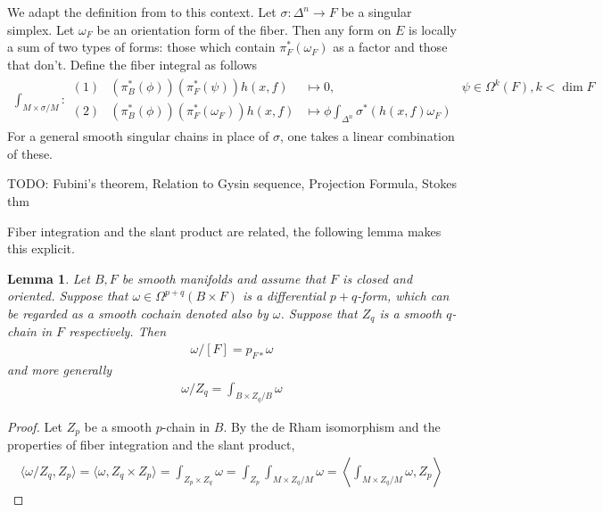 \documentclass{scrartcl}
\theoremstyle{plain}
\newtheorem{lemma}[theorem]{Lemma}
\theoremstyle{definition}
\begin{document}
    We adapt the definition from \cite{bott1982differential} to this context. Let $\sigma\colon \Delta^n\to F$ be a singular simplex. Let $\omega_F$ be an orientation form of the fiber. Then any form on $E$ is locally a sum of two types of forms: those which contain $\pi_F^*(\omega_F)$ as a factor and those that don't. Define the fiber integral as follows
    \begin{align*}
        \int_{M\times\sigma / M} \colon \begin{array}{llll}
             (1) & (\pi_B^*(\phi)) (\pi_F^*(\psi)) h(x, f)  &\mapsto 0, & \psi\in \Omega^k(F), k<\dim F \\
             (2) & (\pi_B^*(\phi)) (\pi_F^*(\omega_F)) h(x, f)  &\mapsto \phi \int_{\Delta^n} \sigma^*(h(x, f) \omega_F) &
        \end{array}
    \end{align*}
    For a general smooth singular chains in place of $\sigma$, one takes a linear combination of these. 

    TODO: Fubini's theorem, Relation to Gysin sequence, Projection Formula, Stokes thm

    Fiber integration and the slant product are related, the following lemma makes this explicit.
    \begin{lemma}
        Let $B, F$ be smooth manifolds and assume that $F$ is closed and oriented. Suppose that $\omega\in \Omega^{p+q}(B\times F)$ is a differential $p+q$-form, which can be regarded as a smooth cochain denoted also by $\omega$. Suppose that $Z_q$ is a smooth $q$-chain in $F$ respectively. Then 
        \begin{align*}
            \omega/[F] = p_{F*}\omega
        \end{align*}
        and more generally
        \begin{align*}
            \omega/Z_q = \int_{B\times Z_q / B} \omega
        \end{align*}
    \end{lemma}
    \begin{proof}
        Let $Z_p$ be a smooth $p$-chain in $B$. By the de Rham isomorphism and the properties of fiber integration and the slant product,
    \begin{align*}
        \langle \omega/Z_q, Z_p \rangle = \langle \omega, Z_q\times Z_p\rangle = \int_{Z_p\times Z_q}\omega = \int_{Z_p} \int_{M\times Z_q / M} \omega = \left\langle \int_{M\times Z_q / M}\omega, Z_p\right\rangle
    \end{align*}
    \end{proof}
\end{document}

